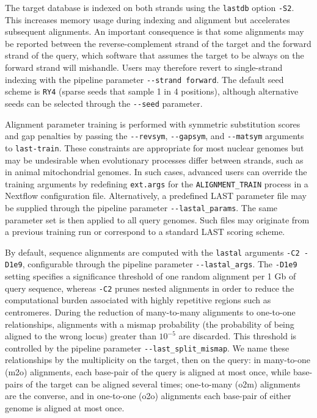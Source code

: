\documentclass[PCJ,Unicode,screen]{cedram}
\begin{document}
The target database is indexed on both strands using the \texttt{lastdb} option \verb|-S2|. This increases memory usage during indexing and alignment but accelerates subsequent alignments. An important consequence is that some alignments may be reported between the reverse-complement strand of the target and the forward strand of the query, which software that assumes the target to be always on the forward strand will mishandle. Users may therefore revert to single-strand indexing with the pipeline parameter \verb|--strand forward|. The default seed scheme is \verb|RY4| (sparse seeds that sample 1 in 4 positions), although alternative seeds can be selected through the \verb|--seed| parameter.

Alignment parameter training is performed with symmetric substitution scores and gap penalties by passing the \verb|--revsym|, \verb|--gapsym|, and \verb|--matsym| arguments to \texttt{last-train}. These constraints are appropriate for most nuclear genomes but may be undesirable when evolutionary processes differ between strands, such as in animal mitochondrial genomes. In such cases, advanced users can override the training arguments by redefining \texttt{ext.args} for the \texttt{ALIGNMENT\_\allowbreak TRAIN} process in a Nextflow configuration file. Alternatively, a predefined LAST parameter file may be supplied through the pipeline parameter \verb|--lastal_params|. The same parameter set is then applied to all query genomes. Such files may originate from a previous training run or correspond to a standard LAST scoring scheme.

By default, sequence alignments are computed with the \texttt{lastal} arguments \verb|-C2 -D1e9|, configurable through the pipeline parameter \verb|--lastal_args|. The \verb|-D1e9| setting specifies a significance threshold of one random alignment per 1 Gb of query sequence, whereas \texttt{-C2} prunes nested alignments in order to reduce the computational burden associated with highly repetitive regions such as centromeres. During the reduction of many-to-many alignments to one-to-one relationships, alignments with a mismap probability (the probability of being aligned to the wrong locus) greater than $10^{-5}$ are discarded. This threshold is controlled by the pipeline parameter \verb|--last_split_mismap|. We name these relationships by the multiplicity on the target, then on the query: in many-to-one (m2o) alignments, each base-pair of the query is aligned at most once, while base-pairs of the target can be aligned several times; one-to-many (o2m) alignments are the converse, and in one-to-one (o2o) alignments each base-pair of either genome is aligned at most once.
\end{document}
